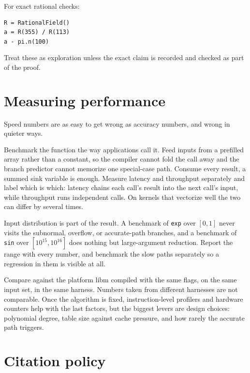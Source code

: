 \documentclass[manuscript, nonacm]{acmart}
\begin{document}
  For exact rational checks:
  \begin{lstlisting}[style=shell]
R = RationalField()
a = R(355) / R(113)
a - pi.n(100)
  \end{lstlisting}

  Treat these as exploration unless the exact claim is recorded and checked as
  part of the proof.



  \section{Measuring performance}

  Speed numbers are as easy to get wrong as accuracy numbers, and wrong in
  quieter ways.

  Benchmark the function the way applications call it. Feed inputs from a
  prefilled array rather than a constant, so the compiler cannot fold the
  call away and the branch predictor cannot memorize one special-case
  path. Consume every result, a summed sink variable is enough. Measure
  latency and throughput separately and label which is which: latency
  chains each call's result into the next call's input, while throughput
  runs independent calls. On kernels that vectorize well the two can
  differ by several times.

  Input distribution is part of the result. A benchmark of
  \texttt{exp} over $[0, 1]$ never visits the subnormal, overflow, or
  accurate-path branches, and a benchmark of \texttt{sin} over
  $[10^{15}, 10^{16}]$ does nothing but large-argument reduction. Report
  the range with every number, and benchmark the slow paths separately so
  a regression in them is visible at all.

  Compare against the platform libm compiled with the same flags, on the
  same input set, in the same harness. Numbers taken from different
  harnesses are not comparable. Once the algorithm is fixed,
  instruction-level profilers and hardware counters help with the last
  factors, but the biggest levers are design choices: polynomial degree,
  table size against cache pressure, and how rarely the accurate path
  triggers.



  \section{Citation policy}
\end{document}
